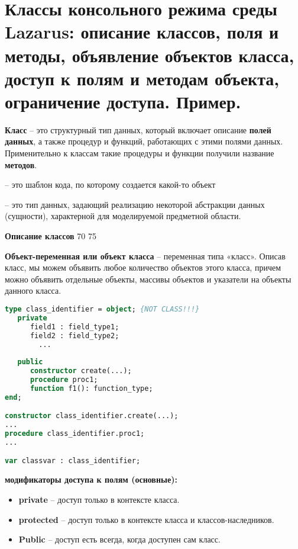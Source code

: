 



\newpage\section{Классы консольного режима среды Lazarus: описание классов, поля и методы, объявление 
объектов класса, доступ к полям и методам объекта, ограничение доступа. Пример. }

\begin{myquote}
            
\end{myquote}

{\bf Класс} – это структурный тип данных, который включает описание {\bf {полей данных}}, а также процедур и функций, работающих с этими полями данных. Применительно к классам такие процедуры и функции получили название {\bf методов}.

	 – это шаблон кода, по которому создается какой-то объект

     – это тип данных, задающий реализацию некоторой абстракции данных (сущности), характерной для моделируемой предметной области. 


{\bf {Описание классов}}
 {70}
 {75}

{\bf Объект-переменная или объект класса} – переменная типа «класс». Описав класс, мы можем объявить любое количество объектов этого 
класса, причем можно объявить отдельные объекты, массивы объектов и указатели на объекты данного класса.

\begin{lstlisting}[language=Pascal]
type class_identifier = object; {NOT CLASS!!!}
   private
      field1 : field_type1;  
      field2 : field_type2;  
        ...
   
   public
      constructor create(...);
      procedure proc1;  
      function f1(): function_type;
end;  

constructor class_identifier.create(...);
...
procedure class_identifier.proc1;  
...

var classvar : class_identifier;
\end{lstlisting}

{\bf модификаторы доступа к полям (основные):}
\begin{itemize}
\item {\bf private} – доступ только в контексте класса.

\item {\bf protected} – доступ только в контексте класса и классов-наследников.

\item {\bf Public} – доступ есть всегда, когда доступен сам класс.
\end{itemize}


